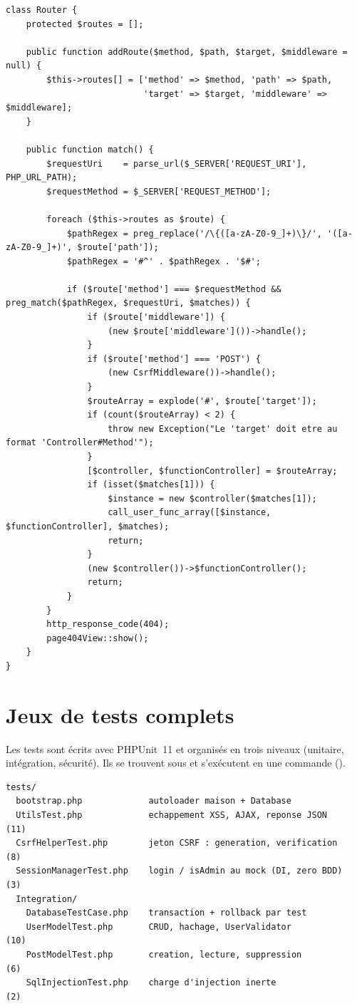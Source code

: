 \begin{lstlisting}[style=php]
class Router {
    protected $routes = [];

    public function addRoute($method, $path, $target, $middleware = null) {
        $this->routes[] = ['method' => $method, 'path' => $path,
                           'target' => $target, 'middleware' => $middleware];
    }

    public function match() {
        $requestUri    = parse_url($_SERVER['REQUEST_URI'], PHP_URL_PATH);
        $requestMethod = $_SERVER['REQUEST_METHOD'];

        foreach ($this->routes as $route) {
            $pathRegex = preg_replace('/\{([a-zA-Z0-9_]+)\}/', '([a-zA-Z0-9_]+)', $route['path']);
            $pathRegex = '#^' . $pathRegex . '$#';

            if ($route['method'] === $requestMethod && preg_match($pathRegex, $requestUri, $matches)) {
                if ($route['middleware']) {
                    (new $route['middleware']())->handle();
                }
                if ($route['method'] === 'POST') {
                    (new CsrfMiddleware())->handle();
                }
                $routeArray = explode('#', $route['target']);
                if (count($routeArray) < 2) {
                    throw new Exception("Le 'target' doit etre au format 'Controller#Method'");
                }
                [$controller, $functionController] = $routeArray;
                if (isset($matches[1])) {
                    $instance = new $controller($matches[1]);
                    call_user_func_array([$instance, $functionController], $matches);
                    return;
                }
                (new $controller())->$functionController();
                return;
            }
        }
        http_response_code(404);
        page404View::show();
    }
}
\end{lstlisting}

\section{Jeux de tests complets}
\label{ann:tests}

Les tests sont écrits avec PHPUnit~11 et organisés en trois niveaux (unitaire, intégration,
sécurité). Ils se trouvent sous  et s'exécutent en une commande
().

\begin{lstlisting}[style=text, caption={Arborescence des tests}]
tests/
  bootstrap.php             autoloader maison + Database
  UtilsTest.php             echappement XSS, AJAX, reponse JSON      (11)
  CsrfHelperTest.php        jeton CSRF : generation, verification     (8)
  SessionManagerTest.php    login / isAdmin au mock (DI, zero BDD)    (3)
  Integration/
    DatabaseTestCase.php    transaction + rollback par test
    UserModelTest.php       CRUD, hachage, UserValidator            (10)
    PostModelTest.php       creation, lecture, suppression           (6)
    SqlInjectionTest.php    charge d'injection inerte                (2)
\end{lstlisting}


